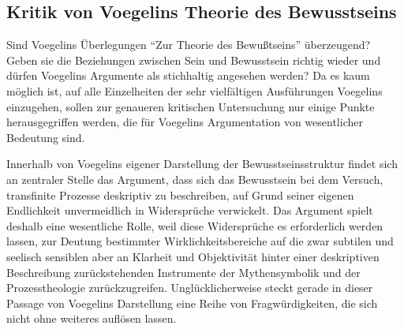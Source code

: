 \subsection{Kritik von Voegelins Theorie des Bewusstseins}

Sind Voegelins Überlegungen "`Zur Theorie des Bewußtseins"' überzeugend? Geben
sie die Beziehungen zwischen Sein und Bewusstsein richtig wieder und dürfen
Voegelins Argumente als stichhaltig angesehen werden? Da es kaum möglich ist,
auf alle Einzelheiten der sehr vielfältigen Ausführungen Voegelins
einzugehen, sollen zur genaueren kritischen Untersuchung nur einige Punkte
herausgegriffen werden, die für Voegelins Argumentation von wesentlicher
Bedeutung sind.

Innerhalb von Voegelins eigener Darstellung der Bewusstseinsstruktur findet
sich an zentraler Stelle das Argument, dass sich das Bewusstsein bei dem
Versuch, transfinite Prozesse deskriptiv zu beschreiben, auf Grund seiner
eigenen Endlichkeit unvermeidlich in Widersprüche verwickelt. Das Argument
spielt deshalb eine wesentliche Rolle, weil diese Widersprüche es erforderlich
werden lassen, zur Deutung bestimmter Wirklichkeitsbereiche auf die zwar
subtilen und seelisch sensiblen aber an Klarheit und Objektivität hinter einer
deskriptiven Beschreibung zurückstehenden Instrumente der Mythensymbolik und
der Prozesstheologie zurückzugreifen. Unglücklicherweise steckt gerade in
dieser Passage von Voegelins Darstellung eine Reihe von Fragwürdigkeiten, die
sich nicht ohne weiteres auflösen lassen.

